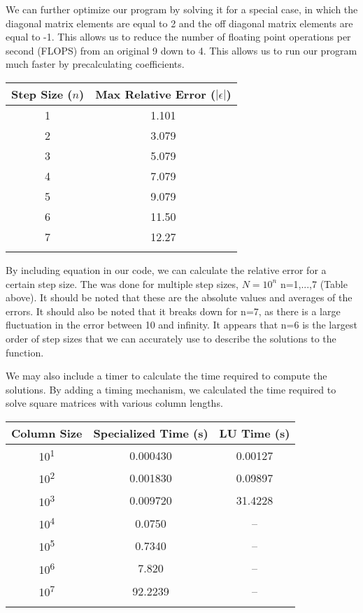 \documentclass[10pt,showpacs,preprintnumbers,footinbib,amsmath,amssymb,aps,prl,twocolumn,groupedaddress,superscriptaddress,showkeys]{revtex4-1}
\begin{document}
We can further optimize our program by solving it for a special case, in which the diagonal matrix elements are equal to 2 and the off diagonal matrix elements are equal to -1.  This allows us to reduce the number of floating point operations per second (FLOPS) from an original 9 down to 4.  This allows us to run our program much faster by precalculating coefficients.




\begin{center}
	\begin{tabular}{cc}
		\hline \hline
			Step Size ($n$) &  Max Relative Error ($|\epsilon|$)\\
			\hline
			1 & 1.101\\
			2 & 3.079\\
			3 & 5.079\\
			4 & 7.079\\
			5 & 9.079\\
			6 & 11.50\\
			7 & 12.27\\
			\hline
			\label{errortable}
	\end{tabular}
\end{center}
	
	By including equation in our code, we can calculate the relative error for a certain step size.  The was done for multiple step sizes, $N=10^{n}$ n=1,...,7 (Table above).    It should be noted that these are the absolute values and averages of the errors.  It should also be noted that it breaks down for n=7, as there is a large fluctuation in the error between 10 and infinity.  It appears that n=6 is the largest order of step sizes that we can accurately use to describe the solutions to the function.
	
	We may also include a timer to calculate the time required to compute the solutions.  By adding a timing mechanism, we calculated the time required to solve square matrices with various column lengths.
	
	\begin{center}
		\begin{tabular}{ccc}
			\hline \hline
			Column Size & Specialized Time (s) & LU Time (s)\\
			\hline
			10\textsuperscript{1} & 0.000430 & 0.00127\\
			10\textsuperscript{2} & 0.001830 &  0.09897\\
			10\textsuperscript{3} & 0.009720 & 31.4228\\
			10\textsuperscript{4} & 0.0750       &  --\\
			10\textsuperscript{5} & 0.7340  & --\\
			10\textsuperscript{6} & 7.820  & --\\
			10\textsuperscript{7} & 92.2239  & --\\
			\hline
			\label{timingtable}
		\end{tabular}
	\end{center}
	
\end{document}

